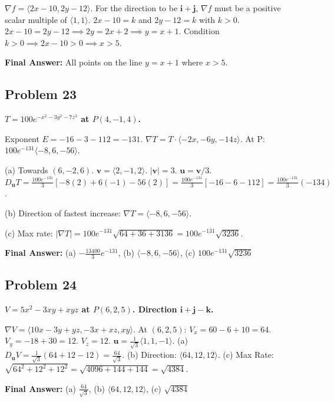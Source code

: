 \documentclass{article}
\begin{document}
$\nabla f = \langle 2x - 10, 2y - 12 \rangle$.
For the direction to be $\mathbf{i} + \mathbf{j}$, $\nabla f$ must be a positive scalar multiple of $\langle 1, 1 \rangle$.
$2x - 10 = k$ and $2y - 12 = k$ with $k > 0$.
$2x - 10 = 2y - 12 \implies 2y = 2x + 2 \implies y = x + 1$.
Condition $k > 0 \implies 2x - 10 > 0 \implies x > 5$.

\textbf{Final Answer:}
All points on the line $\boxed{y = x + 1}$ where $\boxed{x > 5}$.

\hrulefill

\subsection*{Problem 23}
\textbf{$T = 100e^{-x^2-3y^2-7z^2}$ at $P(4, -1, 4)$.}

Exponent $E = -16 - 3 - 112 = -131$.
$\nabla T = T \cdot \langle -2x, -6y, -14z \rangle$.
At P: $100e^{-131} \langle -8, 6, -56 \rangle$.

(a) Towards $(6, -2, 6)$. $\mathbf{v} = \langle 2, -1, 2 \rangle$. $|\mathbf{v}|=3$. $\mathbf{u}=\mathbf{v}/3$.
$D_{\mathbf{u}}T = \frac{100e^{-131}}{3} [-8(2) + 6(-1) - 56(2)] = \frac{100e^{-131}}{3} [-16 - 6 - 112] = \frac{100e^{-131}}{3}(-134)$.

(b) Direction of fastest increase: $\nabla T = \langle -8, 6, -56 \rangle$.

(c) Max rate: $|\nabla T| = 100e^{-131} \sqrt{64 + 36 + 3136} = 100e^{-131} \sqrt{3236}$.

\textbf{Final Answer:}
(a) $\boxed{-\frac{13400}{3}e^{-131}}$, (b) $\boxed{\langle -8, 6, -56 \rangle}$, (c) $\boxed{100e^{-131}\sqrt{3236}}$

\hrulefill

\subsection*{Problem 24}
\textbf{$V = 5x^2 - 3xy + xyz$ at $P(6, 2, 5)$. Direction $\mathbf{i}+\mathbf{j}-\mathbf{k}$.}

$\nabla V = \langle 10x - 3y + yz, -3x + xz, xy \rangle$.
At $(6, 2, 5)$:
$V_x = 60 - 6 + 10 = 64$.
$V_y = -18 + 30 = 12$.
$V_z = 12$.
$\mathbf{u} = \frac{1}{\sqrt{3}}\langle 1, 1, -1 \rangle$.
(a) $D_{\mathbf{u}}V = \frac{1}{\sqrt{3}}(64 + 12 - 12) = \frac{64}{\sqrt{3}}$.
(b) Direction: $\langle 64, 12, 12 \rangle$.
(c) Max Rate: $\sqrt{64^2 + 12^2 + 12^2} = \sqrt{4096 + 144 + 144} = \sqrt{4384}$.

\textbf{Final Answer:}
(a) $\boxed{\frac{64}{\sqrt{3}}}$, (b) $\boxed{\langle 64, 12, 12 \rangle}$, (c) $\boxed{\sqrt{4384}}$
\end{document}
